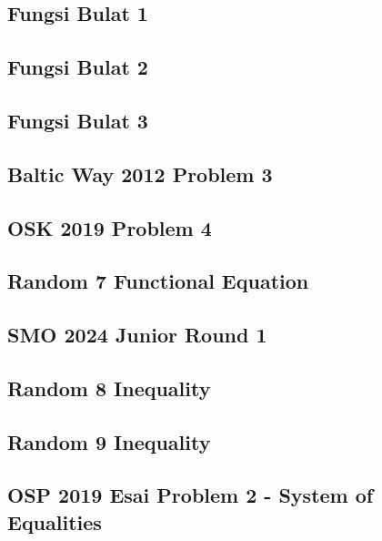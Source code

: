 \subsection{Fungsi Bulat 1}


\subsection{Fungsi Bulat 2}


\subsection{Fungsi Bulat 3}


\subsection{Baltic Way 2012 Problem 3}


\subsection{OSK 2019 Problem 4}


\subsection{Random 7 Functional Equation}


\subsection{SMO 2024 Junior Round 1}


\subsection{Random 8 Inequality}


\subsection{Random 9 Inequality}


\subsection{OSP 2019 Esai Problem 2 - System of Equalities}


